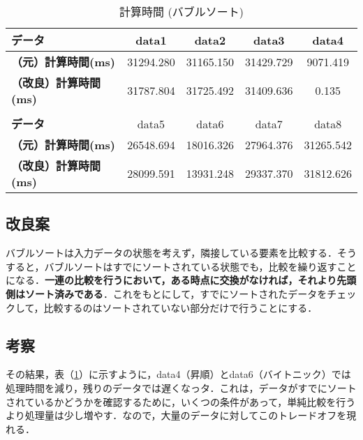 \documentclass[a4j, titlepage]{jarticle}
\begin{document}
            \begin{table}[tbh]
                \caption{計算時間 (バブルソート)}
                \label{tab:bubble}
                \begin{center}
                    \begin{tabular}{lcccc}
                        \hline
                        \textbf{データ} & data1 & data2 &data3 &data4 \\ \hline
                        \textbf{（元）計算時間(ms)} & 31294.280 & 31165.150 & 31429.729 & \cellcolor{green!20}9071.419\\ \hline
                        \textbf{（改良）計算時間(ms)} & 31787.804 & 31725.492 & 31409.636 & \cellcolor{green!20}0.135\\ \hline
                        \\ \hline
                        \textbf{データ} & data5 &data6 &data7 &data8\\ \hline
                        \textbf{（元）計算時間(ms)} & 26548.694 & \cellcolor{green!20}18016.326 & 27964.376 & 31265.542\\ \hline
                        \textbf{（改良）計算時間(ms)} & 28099.591 & \cellcolor{green!20}13931.248 & 29337.370 & 31812.626\\ \hline
                    \end{tabular}
                \end{center}
            \end{table}
        
        \subsection{改良案}
            バブルソートは入力データの状態を考えず，隣接している要素を比較する．そうすると，バブルソートはすでにソートされている状態でも，比較を繰り返すことになる．\textbf{一連の比較を行うにおいて，ある時点に交換がなければ，それより先頭側はソート済みである}\cite{cite:boyoh}．これをもとにして，すでにソートされたデータをチェックして，比較するのはソートされていない部分だけで行うことにする．
        
        \subsection{考察}
            その結果，表（\ref{tab:bubble}）に示すように，data4（昇順）とdata6（バイトニック）では処理時間を減り，残りのデータでは遅くなっタ．これは，データがすでにソートされているかどうかを確認するために，いくつの条件があって，単純比較を行うより処理量は少し増やす．なので，大量のデータに対してこのトレードオフを現れる．
\end{document}
